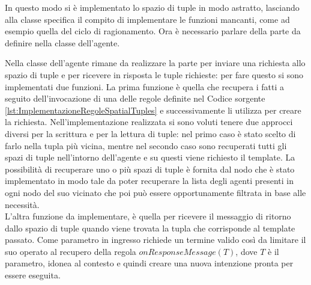 In questo modo si è implementato lo spazio di tuple in modo astratto, lasciando alla classe specifica il compito di implementare le funzioni mancanti, come ad esempio quella del ciclo di ragionamento.
Ora è necessario parlare della parte da definire nella classe dell'agente.

Nella classe dell'agente rimane da realizzare la parte per inviare una richiesta allo spazio di tuple e per ricevere in risposta le tuple richieste: per fare questo si sono implementati due funzioni. La prima funzione è quella che recupera i fatti a seguito dell'invocazione di una delle regole definite nel Codice sorgente \ref{lst:ImplementazioneRegoleSpatialTuples} e successivamente li utilizza per creare la richiesta. Nell'implementazione realizzata si sono voluti tenere due approcci diversi per la scrittura e per la lettura di tuple: nel primo caso è stato scelto di farlo nella tupla più vicina, mentre nel secondo caso sono recuperati tutti gli spazi di tuple nell'intorno dell'agente e su questi viene richiesto il template. La possibilità di recuperare uno o più spazi di tuple è fornita dal nodo che è stato implementato in modo tale da poter recuperare la lista degli agenti presenti in ogni nodo del suo vicinato che poi può essere opportunamente filtrata in base alle necessità.
\\
L'altra funzione da implementare, è quella per ricevere il messaggio di ritorno dallo spazio di tuple quando viene trovata la tupla che corrisponde al template passato. Come parametro in ingresso richiede un termine valido così da limitare il suo operato al recupero della regola $onResponseMessage(T)$, dove $T$ è il parametro, idonea al contesto e quindi creare una nuova intenzione pronta per essere eseguita.


































